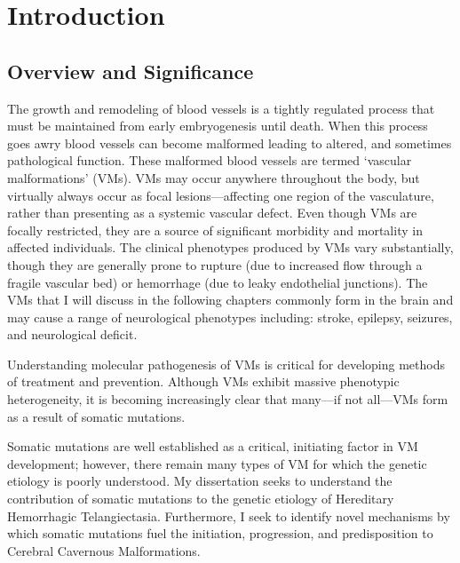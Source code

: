 \chapter{Introduction}
\label{chap:intro}

\clearpage



\section{Overview and Significance}
The growth and remodeling of blood vessels is a tightly regulated process that must be maintained from early embryogenesis until death. When this process goes awry blood vessels can become malformed leading to altered, and sometimes pathological function. These malformed blood vessels are termed `vascular malformations' (VMs). VMs may occur anywhere throughout the body, but virtually always occur as focal lesions---affecting one region of the vasculature, rather than presenting as a systemic vascular defect. Even though VMs are focally restricted, they are a source of significant morbidity and mortality in affected individuals. The clinical phenotypes produced by VMs vary substantially, though they are generally prone to rupture (due to increased flow through a fragile vascular bed) or hemorrhage (due to leaky endothelial junctions). The VMs that I will discuss in the following chapters commonly form in the brain and may cause a range of neurological phenotypes including: stroke, epilepsy, seizures, and neurological deficit.

Understanding molecular pathogenesis of VMs is critical for developing methods of treatment and prevention. Although VMs exhibit massive phenotypic heterogeneity, it is becoming increasingly clear that many---if not all---VMs form as a result of somatic mutations.

Somatic mutations are well established as a critical, initiating factor in VM development; however, there remain many types of VM for which the genetic etiology is poorly understood. My dissertation seeks to understand the contribution of somatic mutations to the genetic etiology of Hereditary Hemorrhagic Telangiectasia. Furthermore, I seek to identify novel mechanisms by which somatic mutations fuel the initiation, progression, and predisposition to Cerebral Cavernous Malformations. 

